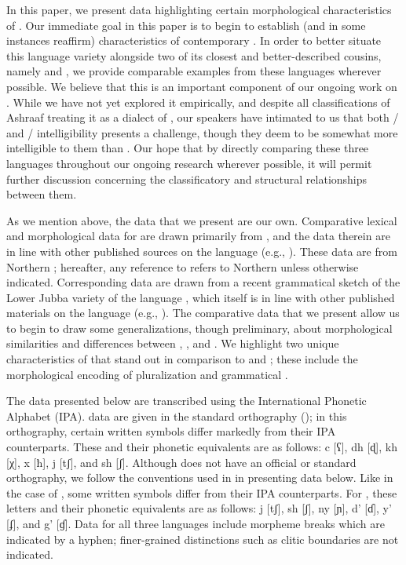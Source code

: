 \documentclass[output=paper,modfonts,nonflat,
hidelinks
]{langsci/langscibook}
\begin{document}
 In this paper, we present data highlighting certain morphological characteristics of . Our immediate goal in this paper is to begin to establish (and in some instances reaffirm) characteristics of contemporary . In order to better situate this language variety alongside two of its closest and better-described cousins, namely  and , we provide comparable examples from these languages wherever possible. We believe that this is an important component of our ongoing work on . While we have not yet explored it empirically, and despite all classifications of Ashraaf treating it as a dialect of , our  speakers have intimated to us that both / and / intelligibility presents a challenge, though they deem  to be somewhat more intelligible to them than . Our hope that by directly comparing these three languages throughout our ongoing research wherever possible, it will permit further discussion concerning the classificatory and structural relationships between them. 
 
 As we mention above, the  data that we present are our own. Comparative lexical and morphological data for  are drawn primarily from \citet{Greenetal2015}, and the data therein are in line with other published sources on the language (e.g., \citealt{Bell1953,Saeed1999}). These data are from Northern ; hereafter, any reference to  refers to Northern  unless otherwise indicated. Corresponding  data are drawn from a recent grammatical sketch of the Lower Jubba variety of the language \citet{PasterRanero2015}, which itself is in line with other published materials on the language (e.g., \citealt{Paster2007,Paster2010,PasterMaayGender}). The comparative data that we present allow us to begin to draw some generalizations, though preliminary, about morphological similarities and differences between , , and . We highlight two unique characteristics of  that stand out in comparison to  and ; these include the morphological encoding of pluralization and grammatical . 
 
 The  data presented below are transcribed using the International Phonetic Alphabet (IPA).  data are given in the standard  orthography (\citealt{Andrzejewski1978}); in this orthography, certain written symbols differ markedly from their IPA counterparts. These and their phonetic equivalents are as follows: c [ʕ], dh [ɖ], kh [χ], x [ħ], j [tʃ], and sh [ʃ]. Although  does not have an official or standard orthography, we follow the conventions used in \citet{PasterRanero2015} in presenting
 data below. Like in the case of , some  written symbols differ from their IPA counterparts. For , these letters and their phonetic equivalents are as follows: j [tʃ], sh [ʃ], ny [ɲ], d' [ɗ], y' [ʄ], and g' [ɠ]. Data for all three languages include morpheme breaks which are indicated by a hyphen; finer-grained distinctions such as clitic boundaries are not indicated. 
 
\end{document}
